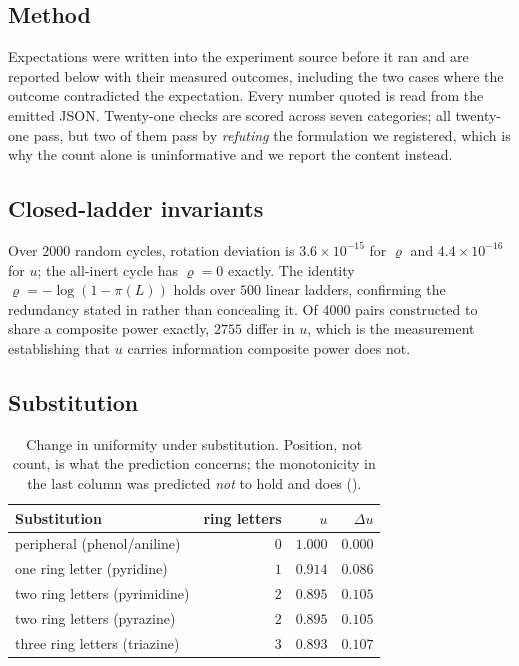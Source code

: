 \documentclass[11pt,a4paper]{article}
\theoremstyle{clthm}
\theoremstyle{definition}
\theoremstyle{remark}
\newcommand{\pow}{\pi}
\newcommand{\Lad}{L}
\newcommand{\circu}{\varrho}
\newcommand{\unif}{u}
\begin{document}
\subsection{Method}

Expectations were written into the experiment source before it ran and are
reported below with their measured outcomes, including the two cases where
the outcome contradicted the expectation. Every number quoted is read from
the emitted JSON. Twenty-one checks are scored across seven categories;
all twenty-one pass, but two of them pass by \emph{refuting} the
formulation we registered, which is why the count alone is uninformative
and we report the content instead.

\subsection{Closed-ladder invariants}

Over $2000$ random cycles, rotation deviation is $3.6\times10^{-15}$ for
$\circu$ and $4.4\times10^{-16}$ for $\unif$; the all-inert cycle has
$\circu=0$ exactly. The identity $\circu=-\log(1-\pow(\Lad))$ holds over
$500$ linear ladders, confirming the redundancy stated in
 rather than concealing it. Of $4000$ pairs
constructed to share a composite power exactly, $2755$ differ in $\unif$,
which is the measurement establishing that $\unif$ carries information
composite power does not.

\subsection{Substitution}

\begin{table}[htbp]
\centering\small
\caption{Change in uniformity under substitution. Position, not count, is
what the prediction concerns; the monotonicity in the last column was
predicted \emph{not} to hold and does ().}
\label{tab:subst}
\begin{tabular}{@{}lrrr@{}}
\toprule
Substitution & ring letters & $\unif$ & $\Delta\unif$\\
\midrule
peripheral (phenol/aniline) & $0$ & $1.000$ & $0.000$\\
one ring letter (pyridine)  & $1$ & $0.914$ & $0.086$\\
two ring letters (pyrimidine)& $2$ & $0.895$ & $0.105$\\
two ring letters (pyrazine) & $2$ & $0.895$ & $0.105$\\
three ring letters (triazine)& $3$ & $0.893$ & $0.107$\\
\bottomrule
\end{tabular}
\end{table}
\end{document}
